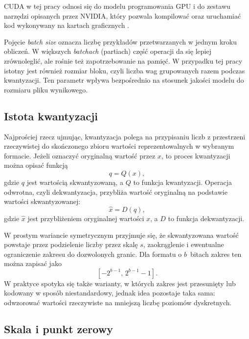 CUDA w tej pracy odnosi się do modelu programowania GPU i do zestawu narzędzi opisanych przez NVIDIA, który pozwala kompilować oraz uruchamiać kod wykonywany na kartach graficznych \cite{nvidia2024cuda}.

Pojęcie \textit{batch size} oznacza liczbę przykładów przetwarzanych w jednym kroku obliczeń. W większych \textit{batchach} (partiach) część operacji da się lepiej zrównoleglić, ale rośnie też zapotrzebowanie na pamięć. W przypadku tej pracy istotny jest również rozmiar bloku, czyli liczba wag grupowanych razem podczas kwantyzacji. Ten parametr wpływa bezpośrednio na stosunek jakości modelu do rozmiaru pliku wynikowego.

\subsection{Istota kwantyzacji}

Najprościej rzecz ujmując, kwantyzacja polega na przypisaniu liczb z przestrzeni rzeczywistej do skończonego zbioru wartości reprezentowalnych w wybranym formacie. Jeżeli oznaczyć oryginalną wartość przez $x$, to proces kwantyzacji można opisać funkcją
\begin{equation}
	q = Q(x),
\end{equation}
gdzie $q$ jest wartością skwantyzowaną, a $Q$ to funkcja kwantyzacji. Operacja odwrotna, czyli dekwantyzacja, przybliża wartość oryginalną na podstawie wartości skwantyzowanej:
\begin{equation}
	\hat{x} = D(q),
\end{equation}
gdzie $\hat{x}$ jest przybliżeniem oryginalnej wartości $x$, a $D$ to funkcja dekwantyzacji.

W prostym wariancie symetrycznym przyjmuje się, że skwantyzowana wartość powstaje przez podzielenie liczby przez skalę $s$, zaokrąglenie i ewentualne ograniczenie zakresu do dozwolonych granic. Dla formatu o $b$~bitach zakres ten można zapisać jako
\begin{equation}
	\left[-2^{b-1},\, 2^{b-1}-1\right].
\end{equation}
W praktyce spotyka się także warianty, w których zakres jest przesunięty lub kodowany w sposób niestandardowy, jednak idea pozostaje taka sama: odwzorować wartości rzeczywiste na mniejszą liczbę poziomów dyskretnych.

\subsection{Skala i punkt zerowy}

